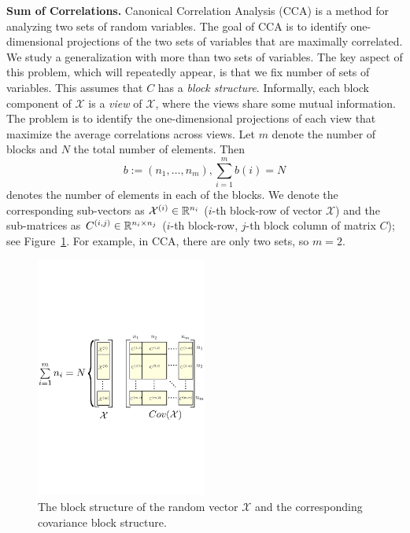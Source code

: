 \noindent\textbf{Sum of Correlations.}
Canonical Correlation Analysis (CCA) is a method for analyzing two sets of random variables. The goal of CCA is
to identify one-dimensional projections of the two sets of variables that are maximally correlated. We study a generalization with more than two sets of variables.
The key aspect of this problem, which will repeatedly appear, is that we fix number of sets of variables. This assumes that $C$
has a \emph{block structure}. Informally, each block component of $\mathcal{X}$  is a \emph{view} of $\mathcal{X}$, where the views share some mutual information. The problem is to identify the one-dimensional projections of each view that maximize the average correlations across views.
%
Let $m$ denote the number of blocks and  $N$ the total number of
elements. Then
$$b := \left(n_1, \ldots, n_m\right), \sum_{i=1}^m b\left(i\right) =
N$$
denotes the number
of elements in each of the blocks. We denote the corresponding
sub-vectors %
as $\mathcal{X}^{(i)} \in \mathbb{R}^{n_i}$
($i$-th block-row of vector $\mathcal{X}$) and the sub-matrices as $C^{(i,j)} \in \mathbb{R}^{n_i \times n_j}$ ($i$-th block-row, $j$-th block column of matrix $C$); see Figure~\ref{fig:block_structure}. For example, in CCA, there are only two sets, so $m=2$.
\begin{figure}[t]
\centering
\includegraphics[width=0.5\textwidth]{figures/block_structure.pdf}
\caption{\label{fig:block_structure} The block structure of the  random vector $\mathcal{X}$ and the corresponding covariance block structure.}
\end{figure}
%
%

